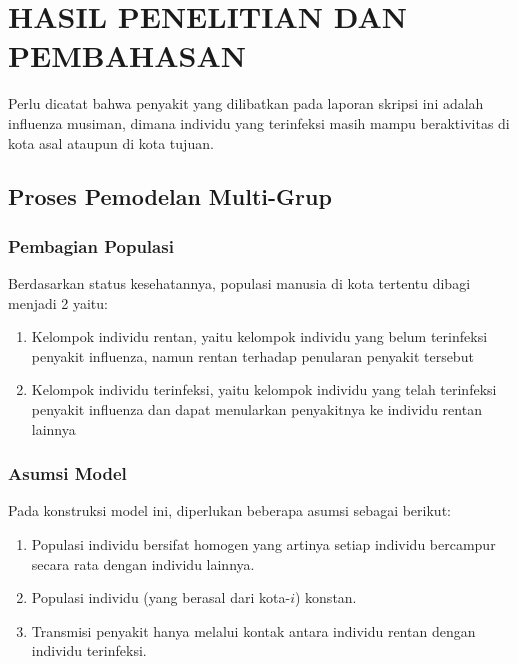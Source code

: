\chapter{\normalsize HASIL PENELITIAN DAN PEMBAHASAN}

Perlu dicatat bahwa penyakit yang dilibatkan pada laporan skripsi ini adalah influenza musiman, dimana individu yang terinfeksi masih mampu beraktivitas di kota asal ataupun di kota tujuan.

\section{Proses Pemodelan Multi-Grup}
\subsection{Pembagian Populasi}
Berdasarkan status kesehatannya, populasi manusia di kota tertentu dibagi menjadi 2 yaitu:
\begin{enumerate}
	\item Kelompok individu rentan, yaitu kelompok individu yang belum terinfeksi penyakit influenza, namun rentan terhadap penularan penyakit tersebut
	\item Kelompok individu terinfeksi, yaitu kelompok individu yang telah terinfeksi penyakit influenza dan dapat menularkan penyakitnya ke individu rentan lainnya
\end{enumerate}

\subsection{Asumsi Model}
Pada konstruksi model ini, diperlukan beberapa asumsi sebagai berikut:
\begin{enumerate}
	\item Populasi individu bersifat homogen yang artinya setiap individu bercampur secara rata dengan individu lainnya.
	\item Populasi individu (yang berasal dari kota-$i$) konstan.
	\item Transmisi penyakit hanya melalui kontak antara individu rentan dengan individu terinfeksi.
\end{enumerate}

